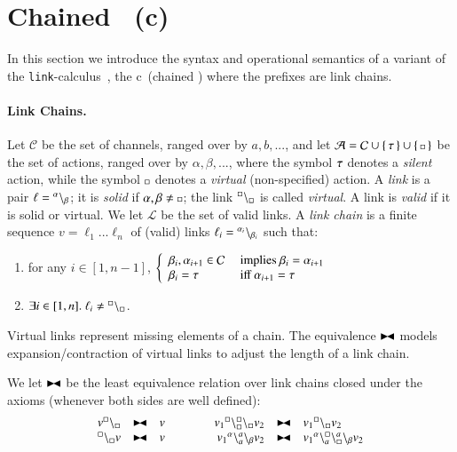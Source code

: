 
\section{Chained \CNA \ (c\CNA)}
\label{sec:ccna}

In this section we introduce  the syntax and operational semantics
of a variant of the {\tt link}-calculus~\cite{BodeiBB12}, the c\CNA\  (chained \CNA)
where the prefixes are link chains.

\paragraph{Link Chains.}
Let $\mathcal{C}$ be the set of channels, ranged over by $a,b,...$, and 
let $\mathcal{A} = \mathcal{C} \cup \{\, \tau \,\} \cup \{\, {\scriptstyle \square} \,\}$ be the set of actions, ranged over by $\alpha,\beta,...$,
where the symbol $\tau$ denotes a \emph{silent} action, while the symbol $\scriptstyle {\square}$ denotes a \emph{virtual} (non-specified) action.
A \emph{link} is a pair $\ell={}^{\alpha} \backslash_{\beta}$;
it is \emph{solid} if $\alpha,\beta \neq \ \noacts$; 
the link ${}^{\scriptstyle {\square}} \backslash_{\scriptstyle {\square}}$ is called \emph{virtual}.
A link is \emph{valid} if it is solid or virtual.
We let $\mathcal{L}$ be the set of valid links.
%
A \emph{link chain} is a 
finite sequence $v = \ell_{1}...\ell_{n}$ of (valid) links  $\ell_{i} = {}^{\alpha_{i}} \backslash_{\beta_{i}}$ such that:
\begin{enumerate}
\item for any $i\in [1,n-1]$, 
$\left\{\begin{array}{ll}
\beta_{i},\alpha_{i+1}\in \mathcal{C} & \mbox{ implies } \beta_{i} = \alpha_{i+1}\\
\beta_{i}=\tau & \mbox{ iff } \alpha_{i+1}=\tau
\end{array}\right.
$
\item  $\exists i \in [1,n]. \ \ell_i \neq {}^{\scriptstyle {\square}} \backslash_{\scriptstyle {\square}}$.
\end{enumerate}

Virtual links represent missing elements of a chain. 
The equivalence $\blackstretcheq$ models expansion/contraction of virtual links to adjust the length of a link chain.


\begin{definition}\label{def:black}
We let $\blackstretcheq$ be the least equivalence relation 
over link chains closed under the axioms (whenever both sides are well defined):
\[
\begin{array}{rclcrcl}
v\link{\noact}{\noact} & \blackstretcheq &  v & \qquad &
v_1 \startchain{\noact}\chainedlink{\noact}{\noact}\chainend{\noact}v_2 & \blackstretcheq & v_1 \link{\noact}{\noact} v_2\\
\link{\noact}{\noact}v & \blackstretcheq & v & &
v_1 \startchain{\alpha}\chainedlink{a}{a}\chainend{\beta} v_2
& \blackstretcheq & 
v_1 \startchain{\alpha}\chainedlink{a}{\noact}\chainedlink{\noact}{a}\chainend{\beta}v_2 
\end{array}
\]
\end{definition}

